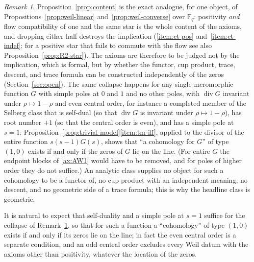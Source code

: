 \documentclass[11pt]{amsart}
\theoremstyle{plain}
\theoremstyle{definition}
\theoremstyle{remark}
\newtheorem{remark}[theorem]{Remark}
\numberwithin{equation}{section}
\newcommand{\F}{\mathbb{F}}
\DeclareMathOperator{\divisor}{div}
\begin{document}
\begin{remark}\label{rem:content}
Proposition~\ref{prop:content} is the exact analogue, for one object,
of Propositions~\ref{prop:weil-linear} and~\ref{prop:weil-converse}
over $\F_q$: positivity \emph{and} flow compatibility of one and the
same star is the whole content of the axioms, and dropping either half
destroys the implication (\ref{item:ct-pos} and~\ref{item:ct-indef};
for a positive star that fails to commute with the flow see also
Proposition~\ref{prop:R2-star}). The axioms are therefore to be judged
not by the implication, which is formal, but by whether the functor,
cup product, trace, descent, and trace formula can be constructed
independently of the zeros (Section~\ref{sec:open}). The same
collapse happens for any single meromorphic function $G$ with simple
poles at $0$ and $1$ and no other poles, with $\divisor G$ invariant
under $\rho\mapsto1-\rho$ and even central order, for instance a
completed member of the Selberg class that is self-dual (so that
$\divisor G$ is invariant under $\rho\mapsto1-\rho$), has root number
$+1$ (so that the central order is even), and has a simple pole at
$s=1$:
Proposition~\ref{prop:trivial-model}\ref{item:tm-iff}, applied to the
divisor of the entire function $s(s-1)G(s)$, shows that ``a cohomology
for $G$'' of type $(1,0)$ exists if and only if the zeros of $G$ lie on
the line. (For entire $G$ the endpoint blocks of \ref{ax:AW1} would
have to be removed, and for poles of higher order they do not
suffice.) An analytic class supplies no object for such a
cohomology to be a functor of, no cup product with an independent
meaning, no descent, and no geometric side of a trace formula; this is
why the headline class is geometric.
\end{remark}

It is natural to expect that self-duality and a simple pole at $s=1$
suffice for the collapse of Remark~\ref{rem:content}, so that for such
a function a ``cohomology'' of type $(1,0)$ exists if and only if its
zeros lie on the line; in fact the even central order is a separate
condition, and an odd central order excludes every Weil datum with the
axioms other than positivity, whatever the location of the zeros.
\end{document}
